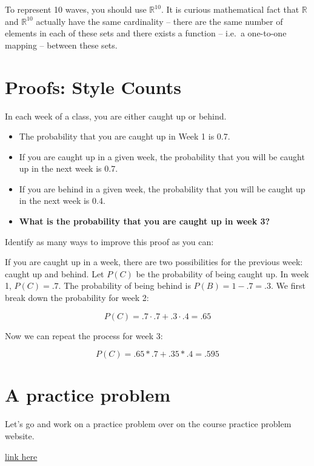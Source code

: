 \documentclass[
]{book}
\providecommand{\tightlist}{%
  \setlength{\itemsep}{0pt}\setlength{\parskip}{0pt}}
\theoremstyle{definition}
\theoremstyle{definition}
\theoremstyle{definition}
\theoremstyle{definition}
\theoremstyle{remark}
\begin{document}
To represent 10 waves, you should use \(\mathbb{R}^{10}\). It is curious mathematical fact that \(\mathbb{R}\) and \(\mathbb{R}^{10}\) actually have the same cardinality -- there are the same number of elements in each of these sets and there exists a function -- i.e.~a one-to-one mapping -- between these sets.

\hypertarget{proofs-style-counts}{%
\section{Proofs: Style Counts}\label{proofs-style-counts}}

In each week of a class, you are either caught up or behind.

\begin{itemize}
\tightlist
\item
  The probability that you are caught up in Week 1 is 0.7.
\item
  If you are caught up in a given week, the probability that you will be caught up in the next week is 0.7.
\item
  If you are behind in a given week, the probability that you will be caught up in the next week is 0.4.
\item
  \textbf{What is the probability that you are caught up in week 3?}
\end{itemize}

Identify as many ways to improve this proof as you can:

If you are caught up in a week, there are two possibilities for the previous week: caught up and behind. Let \(P(C)\) be the probability of being caught up. In week 1, \(P(C) = .7\). The probability of being behind is \(P(B) = 1 - .7 = .3\). We first break down the probability for week 2:

\[P(C) = .7 \cdot .7 + .3 \cdot .4 = .65\]

Now we can repeat the process for week 3:

\[P(C) = .65 * .7 + .35 * .4 = .595\]

\hypertarget{a-practice-problem}{%
\section{A practice problem}\label{a-practice-problem}}

Let's go and work on a practice problem over on the course practice problem website.

\href{https://w203.herokuapp.com/problems/106}{link here}
\end{document}
